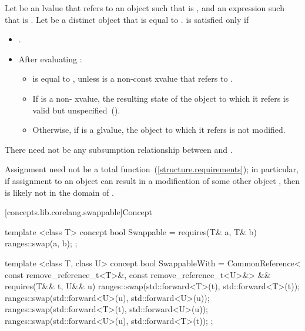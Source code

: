 \begin{itemdescr}
\pnum
Let  be an lvalue that refers to an object  such that
 is , and  an expression such that
 is . Let  be a distinct object that is
equal to .  is satisfied only if

\begin{itemize}
\item {}.

\item After evaluating :

\begin{itemize}
\item {} is equal to , unless  is a non-const xvalue that refers to .

\item If  is a non- xvalue, the resulting state of the
object to which it refers is valid but unspecified~().

\item Otherwise, if  is a glvalue, the object to which it refers is not
modified.
\end{itemize}
\end{itemize}

\pnum
There need not be any subsumption relationship between 
and .

\pnum
\enternote Assignment need not be a total function~(\ref{structure.requirements});
in particular, if assignment to an object  can result in a modification
of some other object , then  is likely not in the domain
of \tcode{=}. \exitnote
\end{itemdescr}

[concepts.lib.corelang.swappable]{Concept }

%
\begin{itemdecl}
template <class T>
concept bool Swappable =
  requires(T& a, T& b) {
    ranges::swap(a, b);
  };

template <class T, class U>
concept bool SwappableWith =
  CommonReference<
    const remove_reference_t<T>&,
    const remove_reference_t<U>&> &&
  requires(T&& t, U&& u) {
    ranges::swap(std::forward<T>(t), std::forward<T>(t));
    ranges::swap(std::forward<U>(u), std::forward<U>(u));
    ranges::swap(std::forward<T>(t), std::forward<U>(u));
    ranges::swap(std::forward<U>(u), std::forward<T>(t));
  };
\end{itemdecl}

